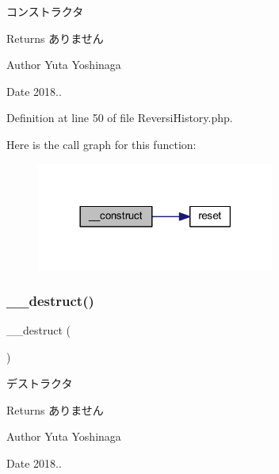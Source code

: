 コンストラクタ 

\begin{DoxyReturn}{Returns}
ありません 
\end{DoxyReturn}
\begin{DoxyAuthor}{Author}
Yuta Yoshinaga 
\end{DoxyAuthor}
\begin{DoxyDate}{Date}
2018.. 
\end{DoxyDate}


Definition at line 50 of file Reversi\+History.\+php.

Here is the call graph for this function\+:\nopagebreak
\begin{figure}[H]
\begin{center}
\leavevmode
\includegraphics[width=222pt]{class_reversi_history_a095c5d389db211932136b53f25f39685_cgraph}
\end{center}
\end{figure}
\mbox{\label{class_reversi_history_a421831a265621325e1fdd19aace0c758}} 
\subsubsection{\texorpdfstring{\+\_\+\+\_\+destruct()}{\_\_destruct()}}
{\footnotesize\ttfamily \+\_\+\+\_\+destruct (\begin{DoxyParamCaption}{ }\end{DoxyParamCaption})}



デストラクタ 

\begin{DoxyReturn}{Returns}
ありません 
\end{DoxyReturn}
\begin{DoxyAuthor}{Author}
Yuta Yoshinaga 
\end{DoxyAuthor}
\begin{DoxyDate}{Date}
2018.. 
\end{DoxyDate}



